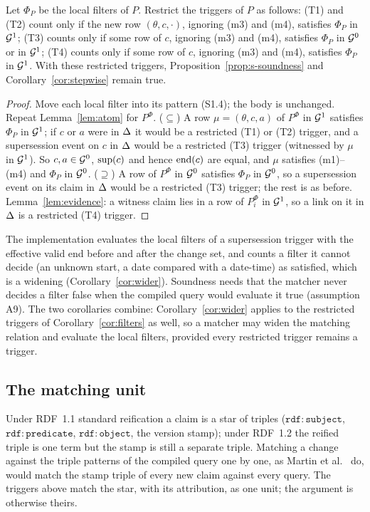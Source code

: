 \begin{corollary}\label{cor:filters}
Let $\Phi_P$ be the local filters of $P$. Restrict the triggers of $P$ as follows: (T1) and (T2)
count only if the new row $(\theta,c,\cdot)$, ignoring (m3) and (m4), satisfies $\Phi_P$ in
$\mathcal G^1$; (T3) counts only if some row of $c$, ignoring (m3) and (m4), satisfies $\Phi_P$ in $\mathcal G^0$
or in $\mathcal G^1$; (T4) counts only if some row of $c$, ignoring (m3) and (m4), satisfies $\Phi_P$ in
$\mathcal G^1$. With these restricted triggers, Proposition~\ref{prop:s-soundness} and
Corollary~\ref{cor:stepwise} remain true.
\end{corollary}
\begin{proof}
Move each local filter into its pattern (S1.4); the body is unchanged. Repeat
Lemma~\ref{lem:atom} for $P^{\Phi}$. ($\subseteq$) A row $\mu=(\theta,c,a)$ of $P^\Phi$ in $\mathcal G^1$
satisfies $\Phi_P$ in $\mathcal G^1$; if $c$ or $a$ were in $\Delta$ it would be a restricted (T1) or (T2)
trigger, and a supersession event on $c$ in $\Delta$ would be a restricted (T3) trigger (witnessed by
$\mu$ in $\mathcal G^1$). So $c,a\in\mathcal G^0$, $\mathrm{sup}(c)$ and hence $\mathrm{end}(c)$ are equal, and $\mu$ satisfies
(m1)--(m4) and $\Phi_P$ in $\mathcal G^0$. ($\supseteq$) A row of $P^\Phi$ in $\mathcal G^0$ satisfies $\Phi_P$ in
$\mathcal G^0$, so a supersession event on its claim in $\Delta$ would be a restricted (T3) trigger; the rest
is as before. Lemma~\ref{lem:evidence}: a witness claim lies in a row of $P_i^\Phi$ in $\mathcal G^1$, so a
link on it in $\Delta$ is a restricted (T4) trigger.
\end{proof}

\noindent The implementation evaluates the local filters of a supersession trigger with the
effective valid end before and after the change set, and counts a filter it cannot decide (an
unknown start, a date compared with a date-time) as satisfied, which is a widening
(Corollary~\ref{cor:wider}). Soundness needs that the matcher never decides a filter false when the
compiled query would evaluate it true (assumption A9). The two corollaries combine: Corollary~\ref{cor:wider}
applies to the restricted triggers of Corollary~\ref{cor:filters} as well, so a matcher may widen
the matching relation and evaluate the local filters, provided every restricted trigger remains
a trigger.

\subsection{The matching unit}

Under RDF~1.1 standard reification a claim is a star of triples ($\mathtt{rdf{:}subject}$,
$\mathtt{rdf{:}predicate}$, $\mathtt{rdf{:}object}$, the version stamp); under RDF~1.2 the
reified triple is one term but the stamp is still a separate triple. Matching a change against the
triple patterns of the compiled query one by one, as Martin et al.~\cite{martin2010caching} do,
would match the stamp triple of every new claim against every query. The triggers above match the
star, with its attribution, as one unit; the argument is otherwise theirs.
